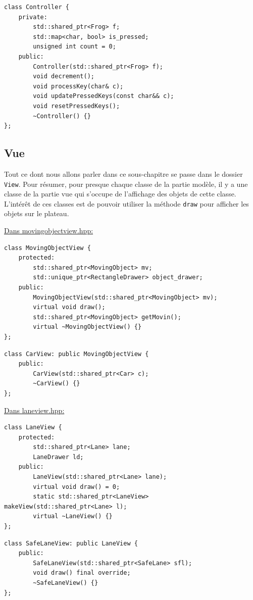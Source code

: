\documentclass[a4paper, 12pt]{article}
\begin{document}
\begin{lstlisting}
class Controller {
    private:
        std::shared_ptr<Frog> f;
        std::map<char, bool> is_pressed;
        unsigned int count = 0;
    public:
        Controller(std::shared_ptr<Frog> f);
        void decrement();
        void processKey(char& c);
        void updatePressedKeys(const char&& c);
        void resetPressedKeys();
        ~Controller() {}
};
\end{lstlisting}

\subsection{Vue}

Tout ce dont nous allons parler dans ce sous-chapitre se passe dans le dossier \texttt{View}. 
Pour résumer, pour presque chaque classe de la partie modèle, 
il y a une classe de la partie vue qui s'occupe de l'affichage des objets de cette classe.
L'intérêt de ces classes est de pouvoir utiliser la méthode \texttt{draw} pour afficher les
objets sur le plateau. 

\underline{Dans movingobjectview.hpp:}

\begin{lstlisting}
class MovingObjectView {
    protected:
        std::shared_ptr<MovingObject> mv;
        std::unique_ptr<RectangleDrawer> object_drawer;
    public:
        MovingObjectView(std::shared_ptr<MovingObject> mv);
        virtual void draw();
        std::shared_ptr<MovingObject> getMovin();
        virtual ~MovingObjectView() {}
};
\end{lstlisting}

\begin{lstlisting}
class CarView: public MovingObjectView {
    public:
        CarView(std::shared_ptr<Car> c);
        ~CarView() {}
};
\end{lstlisting}

\underline{Dans laneview.hpp:}

\begin{lstlisting}
class LaneView {
    protected:
        std::shared_ptr<Lane> lane;
        LaneDrawer ld;
    public:
        LaneView(std::shared_ptr<Lane> lane);
        virtual void draw() = 0;
        static std::shared_ptr<LaneView> makeView(std::shared_ptr<Lane> l);
        virtual ~LaneView() {}
};
\end{lstlisting}

\begin{lstlisting}
class SafeLaneView: public LaneView {
    public:
        SafeLaneView(std::shared_ptr<SafeLane> sfl);
        void draw() final override;
        ~SafeLaneView() {}
};
\end{lstlisting}
\end{document}
